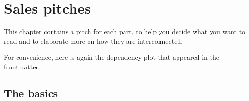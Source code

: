 \chapter{Sales pitches}
\label{ch:sales}
\newcommand{\pitch}[1]{\ii[\textsf{\color{blue}\ref{#1}}.] \textsf{\color{blue} \textbf{\nameref{#1}.}} \\[1ex]} %
\newcommand{\buzzword}[1]{\textbf{\color{green!40!black} #1}}

This chapter contains a pitch for each part,
to help you decide what you want to read
and to elaborate more on how they are interconnected.

For convenience, here is again the dependency plot
that appeared in the frontmatter.


\section{The basics}

